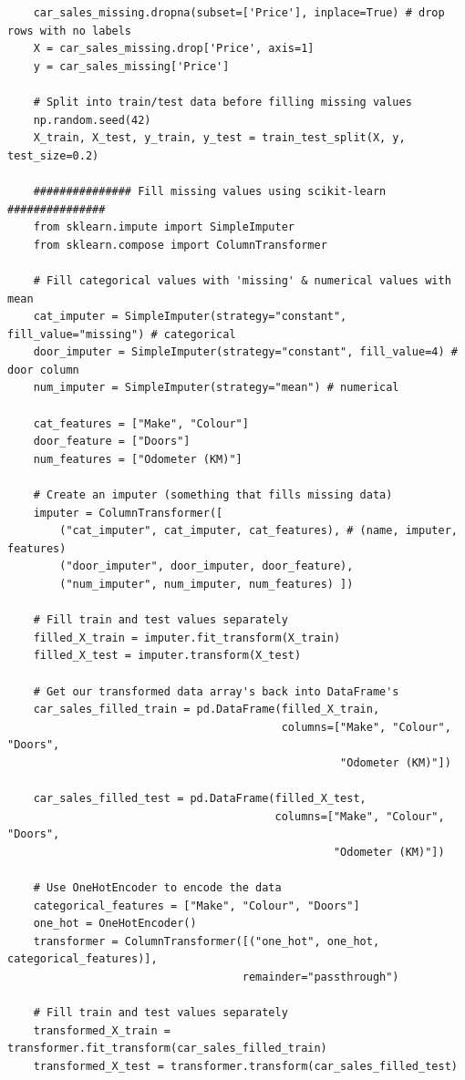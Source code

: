 \documentclass[11pt, a4paper]{article}
\begin{document}
\begin{spacing}{1.1}
\begin{lstlisting}
	car_sales_missing.dropna(subset=['Price'], inplace=True) # drop rows with no labels
	X = car_sales_missing.drop['Price', axis=1]
	y = car_sales_missing['Price']
	
	# Split into train/test data before filling missing values
	np.random.seed(42)
	X_train, X_test, y_train, y_test = train_test_split(X, y, test_size=0.2)
	
	############### Fill missing values using scikit-learn ###############
	from sklearn.impute import SimpleImputer
	from sklearn.compose import ColumnTransformer
	
	# Fill categorical values with 'missing' & numerical values with mean
	cat_imputer = SimpleImputer(strategy="constant", fill_value="missing") # categorical
	door_imputer = SimpleImputer(strategy="constant", fill_value=4) # door column
	num_imputer = SimpleImputer(strategy="mean") # numerical
	
	cat_features = ["Make", "Colour"]
	door_feature = ["Doors"]
	num_features = ["Odometer (KM)"]
	
	# Create an imputer (something that fills missing data)
	imputer = ColumnTransformer([
		("cat_imputer", cat_imputer, cat_features), # (name, imputer, features)
		("door_imputer", door_imputer, door_feature),
		("num_imputer", num_imputer, num_features) ]) 
		
	# Fill train and test values separately
	filled_X_train = imputer.fit_transform(X_train)
	filled_X_test = imputer.transform(X_test)
	
	# Get our transformed data array's back into DataFrame's
	car_sales_filled_train = pd.DataFrame(filled_X_train, 
	                                      columns=["Make", "Colour", "Doors", 
	                                               "Odometer (KM)"])
	
	car_sales_filled_test = pd.DataFrame(filled_X_test, 
	                                     columns=["Make", "Colour", "Doors", 
	                                              "Odometer (KM)"])
	
	# Use OneHotEncoder to encode the data
	categorical_features = ["Make", "Colour", "Doors"]
	one_hot = OneHotEncoder()
	transformer = ColumnTransformer([("one_hot", one_hot, categorical_features)],
	                                remainder="passthrough")
	
	# Fill train and test values separately
	transformed_X_train = transformer.fit_transform(car_sales_filled_train)
	transformed_X_test = transformer.transform(car_sales_filled_test)
	

\end{lstlisting}
\end{spacing}
\end{document}
